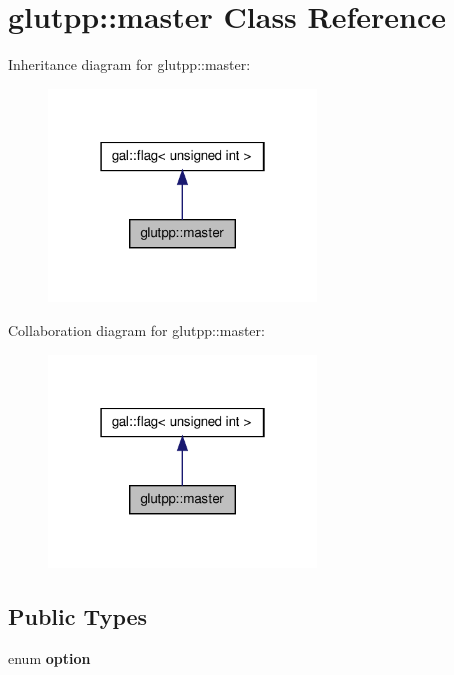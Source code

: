 \hypertarget{classglutpp_1_1master}{\section{glutpp\-:\-:master \-Class \-Reference}
\label{classglutpp_1_1master}
}


\-Inheritance diagram for glutpp\-:\-:master\-:
\nopagebreak
\begin{figure}[H]
\begin{center}
\leavevmode
\includegraphics[width=202pt]{classglutpp_1_1master__inherit__graph}
\end{center}
\end{figure}


\-Collaboration diagram for glutpp\-:\-:master\-:
\nopagebreak
\begin{figure}[H]
\begin{center}
\leavevmode
\includegraphics[width=202pt]{classglutpp_1_1master__coll__graph}
\end{center}
\end{figure}
\subsection*{\-Public \-Types}
\begin{DoxyCompactItemize}
\item 
enum {\bfseries option} 
\end{DoxyCompactItemize}
